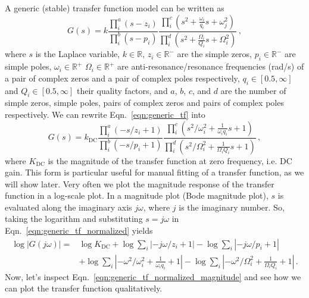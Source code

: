 A generic (stable) transfer function model can be written as
\begin{equation}
	G(s) = k\frac{\prod_i^a (s-z_i)}{\prod_i^b (s-p_i)}\frac{\prod_i^c \left(s^2 + \frac{\omega_i}{q_i}s + \omega_j^2\right)}{\prod_i^d \left(s^2+\frac{\Omega_i}{Q_i}s + \Omega_i^2\right)}\,,
	\label{eqn:generic_tf}
\end{equation}
where $s$ is the Laplace variable, $k\in\mathbb{R}$, $z_i\in\mathbb{R}^-$ are the simple zeros, $p_i\in\mathbb{R}^-$ are simple poles, $\omega_i\in\mathbb{R}^+$ $\Omega_i\in\mathbb{R}^+$ are anti-resonance/resonance frequencies  (rad/s) of a pair of complex zeros and a pair of complex poles respectively, $q_i\in[0.5, \infty]$ and $Q_i\in[0.5, \infty]$ their quality factors, and $a$, $b$, $c$, and $d$ are the number of simple zeros, simple poles, pairs of complex zeros and pairs of complex poles respectively.
We can rewrite Eqn.~\eqref{eqn:generic_tf} into
\begin{equation}
	G(s) = k_\mathrm{DC}\frac{\prod_i^a (-s/z_i+1)}{\prod_i^b (-s/p_i+1)}\frac{\prod_i^c \left(s^2/\omega_i^2 + \frac{1}{\omega_i q_i}s + 1\right)}{\prod_i^d \left(s^2/\Omega_i^2+\frac{1}{\Omega_i Q_i}s + 1\right)}\,,
	\label{eqn:generic_tf_normalized}
\end{equation}
where $K_\mathrm{DC}$ is the magnitude of the transfer function at zero frequency, i.e. DC gain.
This form is particular useful for manual fitting of a transfer function, as we will show later.
Very often we plot the magnitude response of the transfer function in a log-scale plot.
In a magnitude plot (Bode magnitude plot), $s$ is evaluated along the imaginary axis $j\omega$, where $j$ is the imaginary number.
So, taking the logarithm and substituting $s=j\omega$ in Eqn.~\eqref{eqn:generic_tf_normalized} yields
\begin{equation}
	\begin{split}
	\log\left\lvert G(j\omega)\right\rvert = &\log K_\mathrm{DC} + \log \sum_i \left\lvert -j\omega/z_i+1 \right\rvert
	-\log \sum_i \left\lvert -j\omega/p_i+1\right\rvert\\
	&+\log \sum_i \left\lvert -\omega^2/\omega_i^2 + \frac{1}{\omega_i q_i} + 1\right\rvert
	-\log \sum_i \left\lvert -\omega^2/\Omega_i^2 + \frac{1}{\Omega_i Q_i} + 1\right\rvert\,.
	\end{split}
	\label{eqn:generic_tf_normalized_magnitude}
\end{equation}
Now, let's inspect Eqn.~\eqref{eqn:generic_tf_normalized_magnitude} and see how we can plot the transfer function qualitatively.
